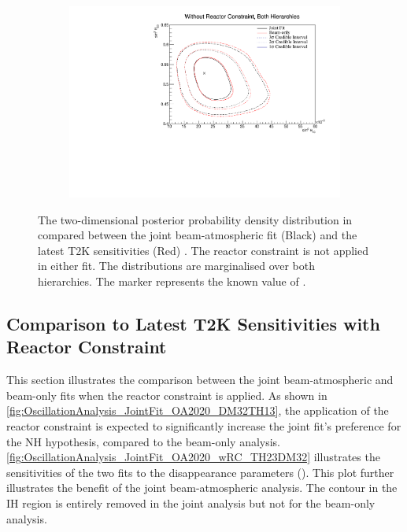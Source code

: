 \begin{figure}[h]
  \begin{subfigure}[t]{0.98\textwidth}
    \includegraphics[width=\textwidth, trim={0mm 0mm 0mm 0mm}, clip,page=1]{Figures/OA/JointFit_OA2020_Comp/ContourComparison_2D_th13_th23_BH_1_woRC_UnSmeared_CredibleInterval.pdf}
  \end{subfigure}
  \caption{The two-dimensional posterior probability density distribution in  compared between the joint beam-atmospheric fit (Black) and the latest T2K sensitivities (Red) \cite{Dunne2020-uf, t2k_tn_393}. The reactor constraint is not applied in either fit. The distributions are marginalised over both hierarchies. The marker represents the known value of .}
  \label{fig:OscillationAnalysis_JointFit_OA2020_TH13TH23}
\end{figure}

\clearpage
\subsection{Comparison to Latest T2K Sensitivities with Reactor Constraint}
\label{sec:OscillationAnalysis_JointFit_OA2020_wRC}
This section illustrates the comparison between the joint beam-atmospheric and beam-only fits when the reactor constraint is applied. As shown in \autoref{fig:OscillationAnalysis_JointFit_OA2020_DM32TH13}, the application of the reactor constraint is expected to significantly increase the joint fit's preference for the NH hypothesis, compared to the beam-only analysis. \autoref{fig:OscillationAnalysis_JointFit_OA2020_wRC_TH23DM32} illustrates the sensitivities of the two fits to the disappearance parameters ().
This plot further illustrates the benefit of the joint beam-atmospheric analysis.
The \quickmath{1\sigma} contour in the IH region is entirely removed in the joint analysis but not for the beam-only analysis.


